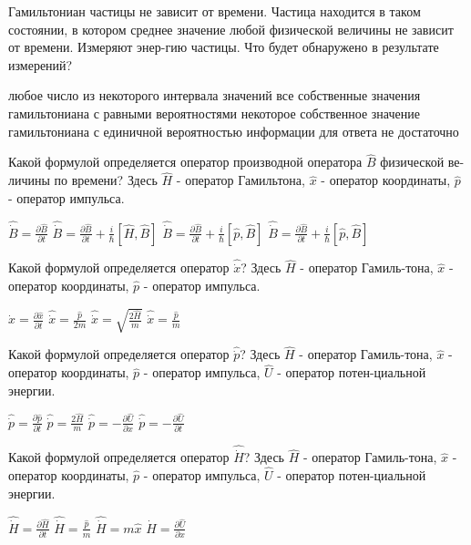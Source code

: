 \documentclass[11pt,a4paper]{exam}
\begin{document}
\begin{questions}
\question Гамильтониан частицы не зависит от времени. Частица находится в таком состоянии, в котором среднее значение любой физической величины не зависит от времени. Измеряют энер-гию частицы. Что будет обнаружено в результате измерений?
\begin{choices}
\choice любое число из некоторого интервала значений
\choice все собственные значения гамильтониана с равными вероятностями
\choice некоторое собственное значение гамильтониана с единичной вероятностью
\choice информации для ответа не достаточно
\end{choices}

\question Какой формулой определяется оператор производной оператора $\hat B$ физической ве-личины по времени? Здесь $\hat H$ - оператор Гамильтона, $\hat x$ - оператор координаты, $\hat p$ - оператор импульса. 
\begin{choices}
\choice $\hat \dot B = \frac{{\partial \hat B}}{{\partial t}}$ 
\choice $\hat \dot B = \frac{{\partial \hat B}}{{\partial t}} + \frac{i}{\hbar }\left[ {\hat H,\hat B} \right]$      
\choice $\hat \dot B = \frac{{\partial \hat B}}{{\partial t}} + \frac{i}{\hbar }\left[ {\hat p,\hat B} \right]$      
\choice $\hat \dot B = \frac{{\partial \hat B}}{{\partial t}} + \frac{i}{\hbar }\left[ {\hat p,\hat B} \right]$
\end{choices}

\question Какой формулой определяется оператор $\hat \dot x$? Здесь $\hat H$ - оператор Гамиль-тона, $\hat x$ - оператор координаты, $\hat p$ - оператор импульса. 
\begin{choices}
\choice $\hat \dot x = \frac{{\partial \hat x}}{{\partial t}}$    
\choice $\hat \dot x = \frac{{\hat p}}{{2m}}$      
\choice $\hat \dot x = \sqrt {\frac{{2\hat H}}{m}} $     
\choice $\hat \dot x = \frac{{\hat p}}{m}$
\end{choices}

\question Какой формулой определяется оператор $\hat \dot p$? Здесь $\hat H$ - оператор Гамиль-тона, $\hat x$ - оператор координаты, $\hat p$ - оператор импульса, $\hat U$ - оператор потен-циальной энергии. 
\begin{choices}
\choice $\hat \dot p = \frac{{\partial \hat p}}{{\partial t}}$    
\choice $\hat \dot p = \frac{{2\hat H}}{m}$     
\choice $\hat \dot p =  - \frac{{\partial \hat U}}{{\partial x}}$    
\choice $\hat \dot p =  - \frac{{\partial \hat U}}{{\partial t}}$
\end{choices}

\question Какой формулой определяется оператор $\hat \dot H$? Здесь $\hat H$ - оператор Гамиль-тона, $\hat x$ - оператор координаты, $\hat p$ - оператор импульса, $\hat U$ - оператор потен-циальной энергии. 
\begin{choices}
\choice $\hat \dot H = \frac{{\partial \hat H}}{{\partial t}}$    
\choice $\hat \dot H = \frac{{\hat p}}{m}$      
\choice $\hat \dot H = m\hat x$     
\choice $\hat \dot H = \frac{{\partial \hat U}}{{\partial x}}$
\end{choices}


\end{questions}
\end{document}
